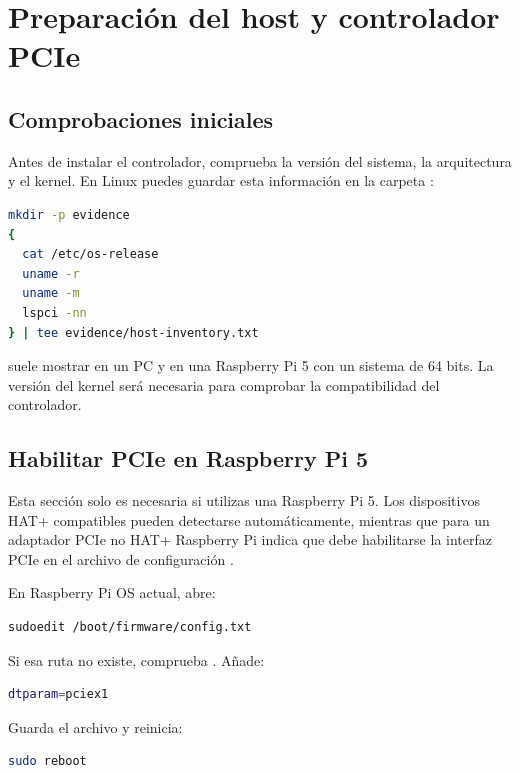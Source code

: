 \chapter{Preparación del host y controlador PCIe}
\label{chap:host-driver}

\section{Comprobaciones iniciales}

Antes de instalar el controlador, comprueba la versión del sistema, la arquitectura y el kernel.
En Linux puedes guardar esta información en la carpeta :

\begin{lstlisting}[language=bash]
mkdir -p evidence
{
  cat /etc/os-release
  uname -r
  uname -m
  lspci -nn
} | tee evidence/host-inventory.txt
\end{lstlisting}

 suele mostrar  en un PC y  en una
Raspberry Pi 5 con un sistema de 64 bits. La versión del kernel será necesaria para
comprobar la compatibilidad del controlador.

\section{Habilitar PCIe en Raspberry Pi 5}

Esta sección solo es necesaria si utilizas una Raspberry Pi 5. Los dispositivos HAT+
compatibles pueden detectarse automáticamente, mientras que para un adaptador PCIe no HAT+
Raspberry Pi indica que debe habilitarse la interfaz PCIe en el archivo de configuración
\cite{rpi_pcie}.

En Raspberry Pi OS actual, abre:

\begin{lstlisting}[language=bash]
sudoedit /boot/firmware/config.txt
\end{lstlisting}

Si esa ruta no existe, comprueba . Añade:

\begin{lstlisting}[language=bash]
dtparam=pciex1
\end{lstlisting}

Guarda el archivo y reinicia:

\begin{lstlisting}[language=bash]
sudo reboot
\end{lstlisting}

